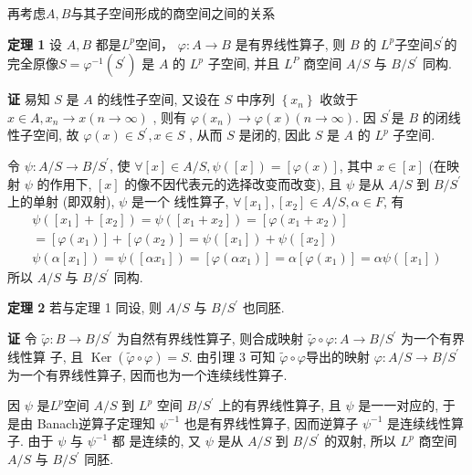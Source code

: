\documentclass[12pt,a4paper,UTF8]{ctexart}
\begin{document}
再考虑$A,B$与其子空间形成的商空间之间的关系

\textbf{定理 1} 设  $A,B$  都是$L^p$空间， $ \varphi: A \rightarrow B $ 是有界线性算子, 则 $ B $ 的 $ L^{p}  $子空间$  S^{\prime}  $的完全原像$  S=\varphi^{-1}\left(S^{\prime}\right) $ 是 $ A $ 的  $L^{p} $ 子空间, 并且 $ L^{P} $ 商空间  $A / S $ 与 $ B / S^{\prime}$  同构.

\textbf{证 } 易知 $ S $ 是 $ A $ 的线性子空间, 又设在 $ S$  中序列  $\left\{x_{n}\right\} $ 收敛于 $ x \in A, x_{n} \rightarrow x(n \rightarrow \infty)$ , 则有 $ \varphi\left(x_{n}\right) \rightarrow \varphi(x)(n \rightarrow \infty) $. 因 $ S^{\prime}  $是 $ B $ 的闭线性子空间, 故 $ \varphi(x) \in S^{\prime}, x \in S$ , 从而  $S$  是闭的, 因此 $ S $ 是 $ A $ 的 $ L^{p}$  子空间.

令 $ \psi: A / S \rightarrow B / S^{\prime} $, 使  $\forall[x] \in A / S, \psi([x])=[\varphi(x)] $, 其中  $x \in[x] $ (在映射 $ \psi $ 的作用下, $ [x]$  的像不因代表元的选择改变而改变), 且 $ \psi $ 是从 $ A / S $ 到 $ B / S^{\prime} $ 上的单射 (即双射),  $\psi $ 是一个 线性算子, $ \forall\left[x_{1}\right],\left[x_{2}\right] \in A / S, \alpha \in F $, 有
$$
\begin{array}{c}
\psi\left(\left[x_{1}\right]+\left[x_{2}\right]\right)=\psi\left(\left[x_{1}+x_{2}\right]\right)=\left[\varphi\left(x_{1}+x_{2}\right)\right] \\
=\left[\varphi\left(x_{1}\right)\right]+\left[\varphi\left(x_{2}\right)\right]=\psi\left(\left[x_{1}\right]\right)+\psi\left(\left[x_{2}\right]\right) \\
\psi\left(\alpha\left[x_{1}\right]\right)=\psi\left(\left[\alpha x_{1}\right]\right)=\left[\varphi\left(\alpha x_{1}\right)\right]=\alpha\left[\varphi\left(x_{1}\right)\right]=\alpha \psi\left(\left[x_{1}\right]\right)
\end{array}
$$
所以  $A / S $ 与  $B / S^{\prime} $ 同构.


\textbf{定理 2} 若与定理 1 同设, 则 $ A / S $ 与  $B / S^{\prime}$  也同胚.

\textbf{证 } 令  $\tilde{\varphi}: B \rightarrow B / S^{\prime} $ 为自然有界线性算子, 则合成映射 $ \tilde{\varphi} \circ \varphi: A \rightarrow B / S^{\prime} $ 为一个有界线性算 子, 且  $\operatorname{Ker}(\tilde{\varphi} \circ \varphi)=S $. 由引理 3 可知  $\tilde{\varphi }\circ \varphi  $导出的映射  $\varphi: A / S \rightarrow B / S^{\prime} $ 为一个有界线性算子, 因而也为一个连续线性算子.

因  $\psi $ 是$  L^p $空间 $ A / S $ 到 $ L^p $ 空间  $B / S^{\prime} $ 上的有界线性算子, 且  $\psi$  是一一对应的, 于是由 Banach逆算子定理知 $ \psi^{-1} $ 也是有界线性算子, 因而逆算子 $ \psi^{-1} $ 是连续线性算子. 由于 $ \psi$  与 $ \psi^{-1} $ 都 是连续的, 又 $ \psi $ 是从  $A / S $ 到  $B / S^{\prime}$  的双射, 所以 $ L^{p}$  商空间 $ A / S $ 与 $ B / S^{\prime} $ 同胚.
\end{document}
